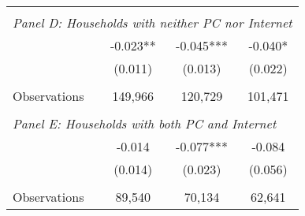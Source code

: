 {\begin{tabular}{lccc}
&  &  &   \\
\multicolumn{4}{l}{\textit{Panel D: Households with neither PC nor Internet}} \\
\hspace{3mm}        &      -0.023** &      -0.045***&      -0.040*  \\
                    &     (0.011)   &     (0.013)   &     (0.022)   \\
                    &               &               &               \\
\hspace{3mm}Observations&     149,966   &     120,729   &     101,471   \\
 
&  &  &   \\
\multicolumn{4}{l}{\textit{Panel E: Households with both PC and Internet}} \\
\hspace{3mm}        &      -0.014   &      -0.077***&      -0.084   \\
                    &     (0.014)   &     (0.023)   &     (0.056)   \\
                    &               &               &               \\
\hspace{3mm}Observations&      89,540   &      70,134   &      62,641   \\
 

\bottomrule
\end{tabular}
}
